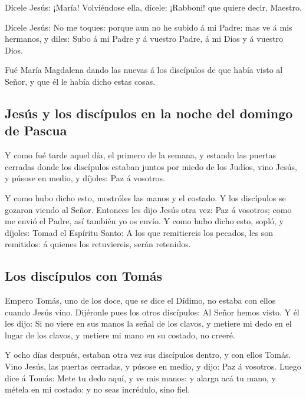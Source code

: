  Dícele Jesús: ¡María! Volviéndose ella, dícele: ¡Rabboni!
que quiere decir, Maestro.

 Dícele Jesús: No me toques: porque aun no he subido á mi
Padre: mas ve á mis hermanos, y diles: Subo á mi Padre y á vuestro
Padre, á mi Dios y á vuestro Dios.

 Fué María Magdalena dando las nuevas á los discípulos de
que había visto al Señor, y que él le había dicho estas cosas.

\hypertarget{jesuxfas-y-los-discuxedpulos-en-la-noche-del-domingo-de-pascua}{%
\subsection{Jesús y los discípulos en la noche del domingo de
Pascua}\label{jesuxfas-y-los-discuxedpulos-en-la-noche-del-domingo-de-pascua}}

 Y como fué tarde aquel día, el primero de la semana, y
estando las puertas cerradas donde los discípulos estaban juntos por
miedo de los Judíos, vino Jesús, y púsose en medio, y díjoles: Paz á
vosotros.

 Y como hubo dicho esto, mostróles las manos y el costado.
Y los discípulos se gozaron viendo al Señor.  Entonces les
dijo Jesús otra vez: Paz á vosotros; como me envió el Padre, así también
yo os envío.  Y como hubo dicho esto, sopló, y díjoles:
Tomad el Espíritu Santo:  A los que remitiereis los
pecados, les son remitidos: á quienes los retuviereis, serán retenidos.

\hypertarget{los-discuxedpulos-con-tomuxe1s}{%
\subsection{Los discípulos con
Tomás}\label{los-discuxedpulos-con-tomuxe1s}}

 Empero Tomás, uno de los doce, que se dice el Dídimo, no
estaba con ellos cuando Jesús vino.  Dijéronle pues los
otros discípulos: Al Señor hemos visto. Y él les dijo: Si no viere en
sus manos la señal de los clavos, y metiere mi dedo en el lugar de los
clavos, y metiere mi mano en su costado, no creeré.

 Y ocho días después, estaban otra vez sus discípulos
dentro, y con ellos Tomás. Vino Jesús, las puertas cerradas, y púsose en
medio, y dijo: Paz á vosotros.  Luego dice á Tomás: Mete tu
dedo aquí, y ve mis manos: y alarga acá tu mano, y métela en mi costado:
y no seas incrédulo, sino fiel.

